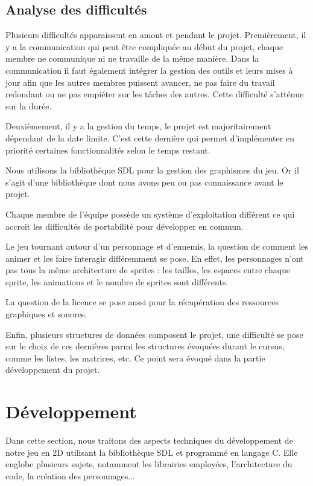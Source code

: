 \documentclass[a4paper,12pt]{article}
\begin{document}
\subsection{Analyse des difficultés}
Plusieurs difficultés apparaissent en amont et pendant le projet. 
Premièrement, il y a la communication qui peut être compliquée au début du projet, chaque membre ne communique ni ne travaille de la même manière. Dans la communication il faut également intégrer la gestion des outils et leurs mises à jour afin que les autres membres puissent avancer, ne pas faire du travail redondant ou ne pas empiéter sur les tâches des autres. Cette difficulté s'atténue sur la durée.

Deuxièmement, il y a la gestion du temps, le projet est majoritairement dépendant de la date limite. C’est cette dernière qui permet d’implémenter en priorité certaines fonctionnalités selon le temps restant.

Nous utilisons la bibliothèque SDL pour la gestion des graphismes du jeu. Or il s’agit d’une bibliothèque dont nous avons peu ou pas connaissance avant le projet.

Chaque membre de l’équipe possède un système d’exploitation différent ce qui accroit les difficultés de portabilité pour développer en commun.

Le jeu tournant autour d’un personnage et d’ennemis, la question de comment les animer et les faire interagir différemment se pose. 
En effet, les personnages n’ont pas tous la même architecture de sprites :  les tailles,  les espaces entre chaque sprite, les animations et le nombre de sprites sont différents.

La question de la licence se pose aussi pour la récupération des ressources graphiques et sonores.

Enfin, plusieurs structures de données composent le projet, une difficulté se pose sur le choix de ces dernières parmi les structures évoquées durant le cursus, comme les listes, les matrices, etc.
Ce point sera évoqué dans la partie développement du projet.


\section{Développement}

Dans cette section, nous traitons des aspects techniques du développement de notre jeu en 2D utilisant la bibliothèque SDL et programmé en langage C. Elle englobe plusieurs sujets, notamment les librairies employées, l'architecture du code, la création des personnages...
\end{document}
